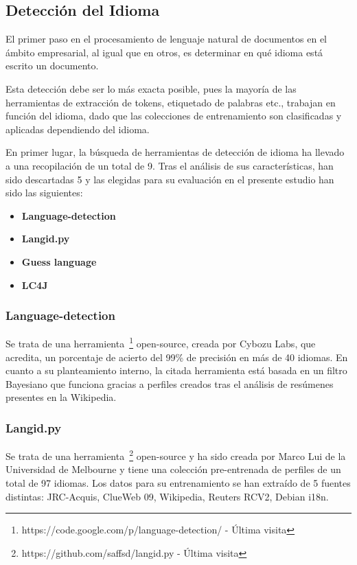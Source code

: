 \documentclass[runningheads,a4paper]{llncs}
\theoremstyle{break}
\begin{document}
\subsection{Detección del Idioma}

El primer paso en el procesamiento de lenguaje natural de documentos en el ámbito empresarial, al igual que en otros, es determinar en qué idioma está escrito un documento.

Esta detección debe ser lo más exacta posible, pues la mayoría de las herramientas de extracción de tokens, etiquetado de palabras etc., trabajan en función del idioma, dado que las colecciones de entrenamiento son clasificadas y aplicadas dependiendo del idioma.

En primer lugar, la búsqueda de herramientas de detección de idioma ha llevado a una recopilación de un total de 9. Tras el análisis de sus características, han sido descartadas 5 y las elegidas para su evaluación en el presente estudio han sido las siguientes:
\textbf{}

\begin{itemize}
  \item \textbf{Language-detection}
  \item \textbf{Langid.py}
   \item \textbf{Guess language}
  \item \textbf{LC4J}
\end{itemize}

\newpage

\subsubsection{Language-detection}
\textbf{}

Se trata de una herramienta~\footnote{https://code.google.com/p/language-detection/ - Última visita } open-source, creada por Cybozu Labs, que acredita, un porcentaje de acierto del 99\% de precisión en más de 40 idiomas. En cuanto a su planteamiento interno, la citada herramienta está basada en un filtro Bayesiano que funciona gracias a perfiles creados tras el análisis de resúmenes presentes en la Wikipedia.

\subsubsection{Langid.py}
\textbf{}

Se trata de una herramienta~\footnote{https://github.com/saffsd/langid.py - Última visita} open-source y ha sido creada por Marco Lui de la Universidad de Melbourne y tiene una colección pre-entrenada de perfiles de un total de 97 idiomas. Los datos para su entrenamiento se han extraído de 5 fuentes distintas: JRC-Acquis, ClueWeb 09, Wikipedia, Reuters RCV2, Debian i18n.
\end{document}
